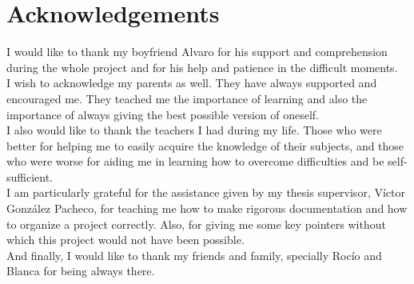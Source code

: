 \chapter{Acknowledgements}
    
\begin {center}

\end{center}

I would like to thank my boyfriend Alvaro for his support and comprehension during the whole project and for his help and patience in the difficult moments. 
\\

I wish to acknowledge my parents as well. They have always supported and encouraged me. They teached me the importance of learning and also the importance of always giving the best possible version of oneself.
\\

I also would like to thank the teachers I had during my life. Those who were better for helping me to easily acquire the knowledge of their subjects, and those who were worse for aiding me in learning how to overcome difficulties and be self-sufficient. 
\\


I am particularly grateful for the assistance given by my thesis supervisor, Víctor González Pacheco, for teaching me how to make rigorous documentation and how to organize a project correctly. Also, for giving me some key pointers without which this project would not have been possible. 
\\
  
And finally, I would like to thank my friends and family, specially Rocío and Blanca for being always there. 

